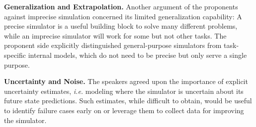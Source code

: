 \textbf{Generalization and Extrapolation.} Another argument of the proponents against imprecise simulation concerned its limited generalization capability: A precise simulator is a useful building block to solve many different problems, while an imprecise simulator will work for some but not other tasks. The proponent side explicitly distinguished general-purpose simulators from  task-specific internal models, which do not need to be precise but only serve a single purpose.

\textbf{Uncertainty and Noise.} The speakers agreed upon the importance of explicit uncertainty estimates, \emph{i.e.} modeling where the simulator is uncertain about its future state predictions. Such estimates, while difficult to obtain, would be useful to identify failure cases early on or leverage them to collect data for improving the simulator.





